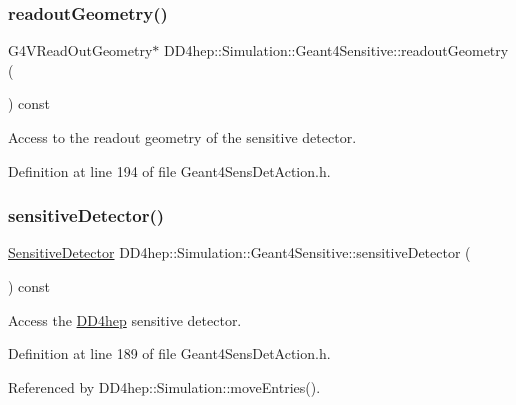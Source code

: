 \subsubsection{\texorpdfstring{readout\+Geometry()}{readoutGeometry()}}
{\footnotesize\ttfamily G4\+V\+Read\+Out\+Geometry$\ast$ D\+D4hep\+::\+Simulation\+::\+Geant4\+Sensitive\+::readout\+Geometry (\begin{DoxyParamCaption}{ }\end{DoxyParamCaption}) const\hspace{0.3cm}{\ttfamily [inline]}}



Access to the readout geometry of the sensitive detector. 



Definition at line 194 of file Geant4\+Sens\+Det\+Action.\+h.

\hypertarget{class_d_d4hep_1_1_simulation_1_1_geant4_sensitive_ad08df051040874abe54e8ea0b189ab49}{}\label{class_d_d4hep_1_1_simulation_1_1_geant4_sensitive_ad08df051040874abe54e8ea0b189ab49} 
\subsubsection{\texorpdfstring{sensitive\+Detector()}{sensitiveDetector()}}
{\footnotesize\ttfamily \hyperlink{class_d_d4hep_1_1_simulation_1_1_geant4_sensitive_a985a23f6592b3ab41b9aa45e47fbc9ea}{Sensitive\+Detector} D\+D4hep\+::\+Simulation\+::\+Geant4\+Sensitive\+::sensitive\+Detector (\begin{DoxyParamCaption}{ }\end{DoxyParamCaption}) const\hspace{0.3cm}{\ttfamily [inline]}}



Access the \hyperlink{namespace_d_d4hep}{D\+D4hep} sensitive detector. 



Definition at line 189 of file Geant4\+Sens\+Det\+Action.\+h.



Referenced by D\+D4hep\+::\+Simulation\+::move\+Entries().

\hypertarget{class_d_d4hep_1_1_simulation_1_1_geant4_sensitive_a460ae8107334780c1c69982c7b054e41}{}\label{class_d_d4hep_1_1_simulation_1_1_geant4_sensitive_a460ae8107334780c1c69982c7b054e41} 

